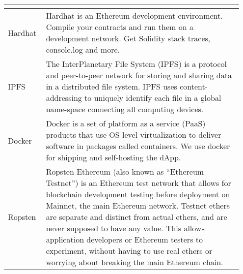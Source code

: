 \begin{longtable}{p{0.15\linewidth} | p{0.80\linewidth}}
{  }
  \\\hline
  Hardhat & {
    Hardhat is an Ethereum development environment. Compile your contracts and run them on a development network. Get Solidity stack traces, console.log and more.
  }
  \\\hline
  IPFS & {
    The InterPlanetary File System (IPFS) is a protocol and peer-to-peer network for storing and sharing data in a distributed file system. IPFS uses content-addressing to uniquely identify each file in a global name-space connecting all computing devices.
  }
  \\\hline
  Docker & {
    Docker is a set of platform as a service (PaaS) products that use OS-level virtualization to deliver software in packages called containers. We use docker for shipping and self-hosting the dApp.
  }
  \\\hline
  Ropsten & {
    Ropsten Ethereum (also known as ``Ethereum Testnet'') is an Ethereum test network that allows for blockchain development testing before deployment on Mainnet, the main Ethereum network. Testnet ethers are separate and distinct from actual ethers, and are never supposed to have any value. This allows application developers or Ethereum testers to experiment, without having to use real ethers or worrying about breaking the main Ethereum chain.
  }
  \\\bottomrule
\end{longtable}
